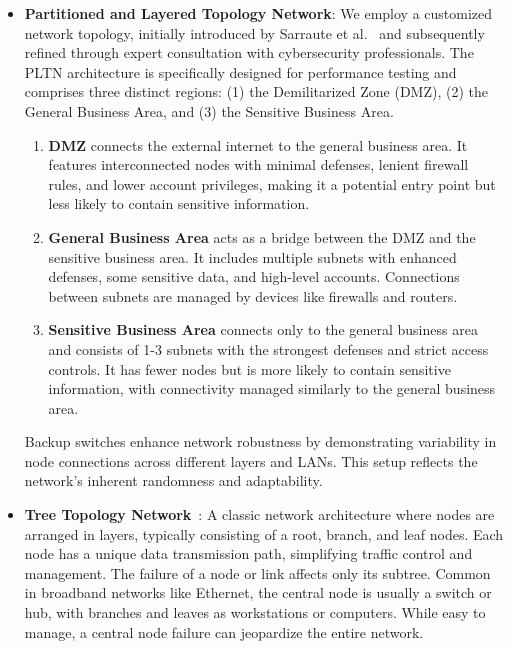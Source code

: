 \begin{itemize}
    \item \textbf{Partitioned and Layered Topology Network}: We employ a customized network topology, initially introduced by Sarraute et al.~\cite{sarraute2012pomdps} and subsequently refined through expert consultation with cybersecurity professionals. The PLTN architecture is specifically designed for performance testing and comprises three distinct regions: (1) the Demilitarized Zone (DMZ), (2) the General Business Area, and (3) the Sensitive Business Area.

        \begin{enumerate}
            \item \textbf{DMZ} connects the external internet to the general business area. It features interconnected nodes with minimal defenses, lenient firewall rules, and lower account privileges, making it a potential entry point but less likely to contain sensitive information.
            \item \textbf{General Business Area} acts as a bridge between the DMZ and the sensitive business area. It includes multiple subnets with enhanced defenses, some sensitive data, and high-level accounts. Connections between subnets are managed by devices like firewalls and routers.
            \item \textbf{Sensitive Business Area} connects only to the general business area and consists of 1-3 subnets with the strongest defenses and strict access controls. It has fewer nodes but is more likely to contain sensitive information, with connectivity managed similarly to the general business area.
        \end{enumerate}
        Backup switches enhance network robustness by demonstrating variability in node connections across different layers and LANs. This setup reflects the network's inherent randomness and adaptability.

    \item \textbf{Tree Topology Network}~\cite{Brede2012NetworksAnIM}: A classic network architecture where nodes are arranged in layers, typically consisting of a root, branch, and leaf nodes. Each node has a unique data transmission path, simplifying traffic control and management. The failure of a node or link affects only its subtree. Common in broadband networks like Ethernet, the central node is usually a switch or hub, with branches and leaves as workstations or computers. While easy to manage, a central node failure can jeopardize the entire network.


\end{itemize}
